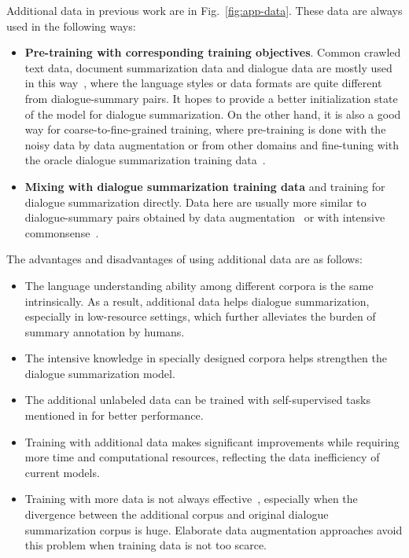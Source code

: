 Additional data in previous work are in Fig.~\ref{fig:app-data}. These data are always used in the following ways:
\begin{itemize}
	\item \textbf{Pre-training with corresponding training objectives}. 
Common crawled text data, document summarization data and dialogue data are 
mostly used in this way~\cite{zou2021low}, where the language styles or data 
formats are quite different from dialogue-summary pairs. It hopes to 
provide a better initialization state of the model for dialogue summarization. 
On the other hand, it is also a good way for coarse-to-fine-grained training, 
where pre-training is done with the noisy data by data augmentation or from other 
domains and fine-tuning with the oracle dialogue summarization training data~\cite{feng2020dialogue,zhu2021mediasum}.


\item \textbf{Mixing with dialogue summarization training data} and 
training for dialogue summarization directly. 
Data here are usually more similar to dialogue-summary pairs obtained by data 
augmentation~\cite{liu2021controllable,khalifa2021bag} or with intensive 
commonsense~\cite{khalifa2021bag,liu2022data}. 
\end{itemize}

The advantages and disadvantages of using additional data are as follows:
\begin{itemize}
	\item[\Checkmark] The language understanding ability among different 
corpora is the same intrinsically. As a result, additional data helps 
dialogue summarization, especially in low-resource settings, 
which further alleviates the burden of summary annotation by humans.
	\item[\Checkmark] The intensive knowledge in specially designed 
corpora helps strengthen the dialogue summarization model. 
	\item[\Checkmark] The additional unlabeled data can be trained 
with self-supervised tasks mentioned in  for 
better performance.
	\item[\XSolidBrush] Training with additional data makes significant improvements while requiring 
more time and computational resources, reflecting the data inefficiency of current models.
	\item[\XSolidBrush] Training with more data is not always effective~\cite{zhang2021exploratory,nair2021data}, especially when the divergence between 
the additional corpus and original dialogue summarization corpus is huge.  Elaborate data augmentation approaches avoid this problem when training data is not too scarce.
\end{itemize}
	

